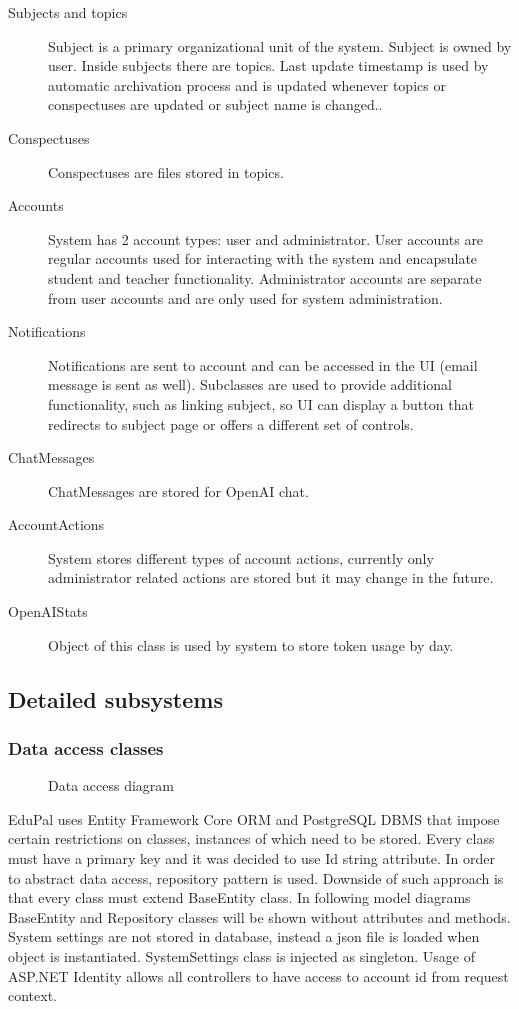 \documentclass[
    english, %
]{VUMIFPSkursinis}
\begin{document}
\begin{description}
    \item[Subjects and topics] Subject is a primary organizational unit of the system. Subject is owned by user. Inside subjects there are topics. Last update timestamp is used by automatic archivation process and is updated whenever topics or conspectuses are updated or subject name is changed..
    \item[Conspectuses] Conspectuses are files stored in topics.
    \item[Accounts] System has 2 account types: user and administrator. User accounts are regular accounts used for interacting with the system and encapsulate student and teacher functionality. Administrator accounts are separate from user accounts and are only used for system administration.
    \item[Notifications] Notifications are sent to account and can be accessed in the UI (email message is sent as well). Subclasses are used to provide additional functionality, such as linking subject, so UI can display a button that redirects to subject page or offers a different set of controls.
    \item[ChatMessages] ChatMessages are stored for OpenAI chat.
    \item[AccountActions] System stores different types of account actions, currently only administrator related actions are stored but it may change in the future.
    \item[OpenAIStats] Object of this class is used by system to store token usage by day.
\end{description}

\subsection{Detailed subsystems}

\subsubsection{Data access classes}

\begin{figure}[ht]
    \centering
    
    \caption{Data access diagram}
    \label{data-access-model}
\end{figure}

EduPal uses Entity Framework Core ORM and PostgreSQL DBMS that impose certain restrictions on classes, instances of which need to be stored. Every class must have a primary key and it was decided to use Id string attribute. In order to abstract data access, repository pattern is used. Downside of such approach is that every class must extend BaseEntity class. In following model diagrams BaseEntity and Repository classes will be shown without attributes and methods. System settings are not stored in database, instead a json file is loaded when object is instantiated. SystemSettings class is injected as singleton. Usage of ASP.NET Identity allows all controllers to have access to account id from request context.
\end{document}
